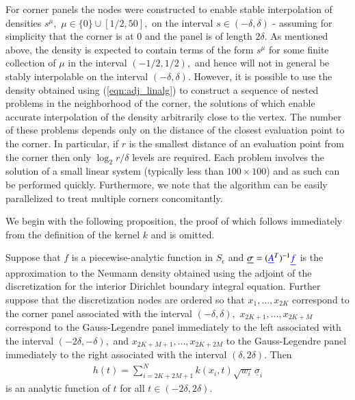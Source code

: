 For corner panels the nodes were constructed to enable stable interpolation of densities $s^\mu,$ $\mu \in \{0\} \cup [1/2,50],$ on the interval $s \in (-\delta,\delta)$ - assuming for simplicity that the corner is at $0$ and the panel is of length $2 \delta.$ As mentioned above, the density is expected to contain terms of the form $s^\mu$ for some finite collection of $\mu$ in the interval $(-1/2,1/2),$ and hence will not in general be stably interpolable on the interval $(-\delta,\delta).$ However, it is possible to use the density obtained using (\ref{eqn:adj_linalg}) to construct a sequence of nested problems in the neighborhood of the corner, the solutions of which enable accurate interpolation of the density arbitrarily close to the vertex. The number of these problems depends only on the distance of the closest evaluation point to the corner. In particular, if $r$ is the smallest distance of an evaluation point from the corner then only $\log_2 r/\delta$ levels are required. Each problem involves the solution of a small linear system (typically less than $100 \times 100$) and as such can be performed quickly. Furthermore, we note that the algorithm can be easily parallelized to treat multiple corners concomitantly.

We begin with the following proposition, the proof of which follows immediately from the definition of the kernel $k$ and is omitted.
\begin{proposition}\label{prop_hanalytic}
Suppose that $f$ is a piecewise-analytic function in $S_\epsilon$ and  $\underline{\sigma} = ({\color{blue} \underline{A}}^T)^{-1} {\color{blue} \underline{f}}$ is the approximation to the Neumann density obtained using the adjoint of the discretization for the interior Dirichlet boundary integral equation. Further suppose that the discretization nodes are ordered so that $x_1,\dots,x_{2K}$ correspond to the corner panel associated with the interval $(-\delta,\delta),$ $x_{2K+1},\dots,x_{2K+M}$ correspond to the Gauss-Legendre panel immediately to the left associated with the interval $(-2\delta,-\delta),$ and $x_{2K+M+1},\dots,x_{2K+2M}$ to the Gauss-Legendre panel immediately to the right associated with the interval $(\delta,2\delta).$
Then
\begin{align}\label{eqn:def_hfun}
h(t) = \sum_{i=2K+2M+1}^N k(x_i,t) \sqrt{w_i} \,\underline{\sigma}_i
\end{align}
is an analytic function of $t$ for all $t \in (-2\delta,2\delta).$
\end{proposition}

